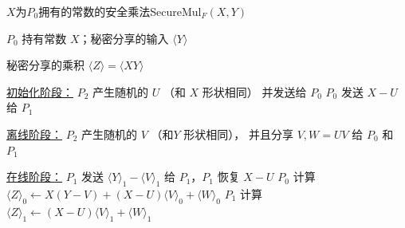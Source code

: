 \begin{algorithm}[h!]
    \caption{$X$为$P_0$拥有的常数的安全乘法\textsf{SecureMul}$_F(X, Y)$}
    \label{alg:perm-llm:secure_mul_fixed}
    \begin{algorithmic}[1]
    \Require $P_0$ 持有常数 $X$；秘密分享的输入 $\langle Y \rangle$
    
    \Ensure 秘密分享的乘积 $\langle Z \rangle = \langle XY \rangle$
    
    \item[\underline{初始化阶段：}]
    \State $P_2$ 产生随机的 $U$ （和 $X$ 形状相同） 并发送给 $P_0$
    \State $P_0$ 发送 $X - U$ 给 $P_1$
    
    \item[\underline{离线阶段：}]
    \State $P_2$ 产生随机的 $V$ （和$Y$ 形状相同）， 并且分享 $V, W = UV$ 给 $P_0$ 和 $P_1$
    
    \item[\underline{在线阶段：}]
    \State $P_1$ 发送 $\langle Y \rangle_1 - \langle V \rangle_1$ 给 $P_1$，$P_1$ 恢复 $X - U$
    \State $P_0$ 计算 $\langle Z \rangle_0 \gets X(Y-V) + (X-U)\langle V \rangle_0 + \langle W \rangle_0$
    \State $P_1$ 计算 $\langle Z \rangle_1 \gets (X-U) \langle V \rangle_1 + \langle W \rangle_1$
    \end{algorithmic}
\end{algorithm}


